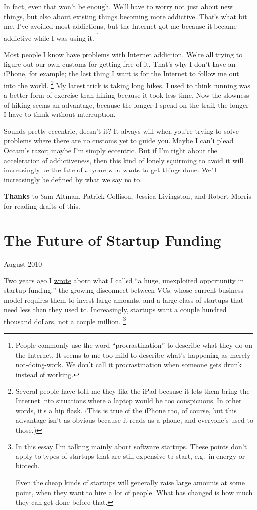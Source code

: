 \documentclass[12pt]{book}
\begin{document}
In fact, even that won't be enough. We'll have to worry not just about
new things, but also about existing things becoming more addictive.
That's what bit me. I've avoided most addictions, but the Internet got
me because it became addictive while I was using it.
\footnote{People commonly use the word ``procrastination'' to describe
what they do on the Internet. It seems to me too mild to describe what's
happening as merely not-doing-work. We don't call it procrastination
when someone gets drunk instead of working.}

Most people I know have problems with Internet addiction. We're all
trying to figure out our own customs for getting free of it. That's why
I don't have an iPhone, for example; the last thing I want is for the
Internet to follow me out into the world. \footnote{Several people have told me they like the iPad because it lets
them bring the Internet into situations where a laptop would be too
conspicuous. In other words, it's a hip flask. (This is true of the
iPhone too, of course, but this advantage isn't as obvious because it
reads as a phone, and everyone's used to those.)} My
latest trick is taking long hikes. I used to think running was a better
form of exercise than hiking because it took less time. Now the slowness
of hiking seems an advantage, because the longer I spend on the trail,
the longer I have to think without interruption.

Sounds pretty eccentric, doesn't it? It always will when you're trying
to solve problems where there are no customs yet to guide you. Maybe I
can't plead Occam's razor; maybe I'm simply eccentric. But if I'm right
about the acceleration of addictiveness, then this kind of lonely
squirming to avoid it will increasingly be the fate of anyone who wants
to get things done. We'll increasingly be defined by what we say no to.


\textbf{Thanks} to Sam Altman, Patrick Collison, Jessica Livingston, and
Robert Morris for reading drafts of this.
\chapter{The Future of Startup Funding }

August 2010

Two years ago I
\href{http://www.paulgraham.com/googles.html\#next}{wrote} about what I
called ``a huge, unexploited opportunity in startup funding:'' the
growing disconnect between VCs, whose current business model requires
them to invest large amounts, and a large class of startups that need
less than they used to. Increasingly, startups want a couple hundred
thousand dollars, not a couple million. \footnote{In this essay I'm talking mainly about software startups. These
points don't apply to types of startups that are still expensive to
start, e.g.~in energy or biotech.

Even the cheap kinds of startups will generally raise large amounts at
some point, when they want to hire a lot of people. What has changed is
how much they can get done before that.}
\end{document}
